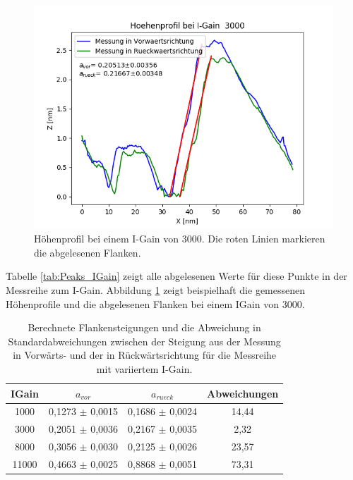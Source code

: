 \documentclass[12pt,a4paper]{article}
\begin{document}
\begin{figure}
\centering
\includegraphics[scale=0.8]{Bilder/Anhang/IGain/Profil_IGain_3000.png}
\caption{Höhenprofil bei einem I-Gain von 3000. Die roten Linien markieren die abgelesenen Flanken.}
\label{fig:Gold_IGain_Flankensteigung}
\end{figure}

Tabelle \ref{tab:Peaks_IGain} zeigt alle abgelesenen Werte für diese Punkte in der Messreihe zum I-Gain. Abbildung \ref{fig:Gold_IGain_Flankensteigung} zeigt beispielhaft die gemessenen Höhenprofile und die abgelesenen Flanken bei einem IGain von 3000. 

\begin{table}
\centering
\begin{tabular}{|c|c|c|c|}
\hline 
IGain & $a_{vor}$ & $a_{rueck}$ & Abweichungen \\ 
\hline 
1000 & 0,1273 $\pm$ 0,0015 & 0,1686 $\pm$ 0,0024 & 14,44 \\
\hline 
3000 & 0,2051 $\pm$ 0,0036 & 0,2167 $\pm$ 0,0035 & 2,32 \\ 
\hline 
8000 & 0,3056 $\pm$ 0,0030 & 0,2125 $\pm$ 0,0026 & 23,57 \\
\hline 
11000 & 0,4663 $\pm$ 0,0025 & 0,8868 $\pm$ 0,0051 & 73,31 \\
\hline 
\end{tabular} 
\caption{Berechnete Flankensteigungen und die Abweichung in Standardabweichungen zwischen der Steigung aus der Messung in Vorwärts- und der in Rückwärtsrichtung für die Messreihe mit variiertem I-Gain.}
\label{tab:Steigungen_IGain}
\end{table}
\end{document}
